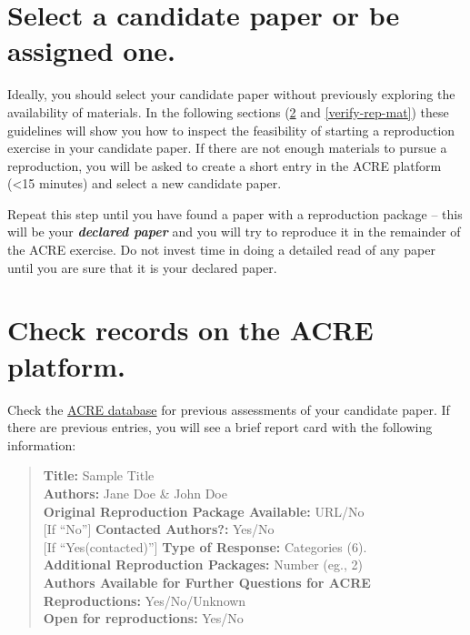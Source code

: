 \documentclass[]{book}
\begin{document}
\hypertarget{select-a-candidate-paper-or-be-assigned-one.}{%
\section{Select a candidate paper or be assigned one.}\label{select-a-candidate-paper-or-be-assigned-one.}}

Ideally, you should select your candidate paper without previously exploring the availability of materials. In the following sections (\ref{check-acre} and \ref{verify-rep-mat}) these guidelines will show you how to inspect the feasibility of starting a reproduction exercise in your candidate paper. If there are not enough materials to pursue a reproduction, you will be asked to create a short entry in the ACRE platform (\textless{}15 minutes) and select a new candidate paper.

Repeat this step until you have found a paper with a reproduction package -- this will be your \textbf{\emph{declared paper}} and you will try to reproduce it in the remainder of the ACRE exercise. Do not invest time in doing a detailed read of any paper until you are sure that it is your declared paper.

\hypertarget{check-acre}{%
\section{Check records on the ACRE platform.}\label{check-acre}}

Check the \href{ADD\%20LINK}{ACRE database} for previous assessments of your candidate paper. If there are previous entries, you will see a brief report card with the following information:

\begin{quote}
\textbf{Title:} Sample Title\\
\textbf{Authors:} Jane Doe \& John Doe\\
\textbf{Original Reproduction Package Available:} URL/No\\
{[}If ``No''{]} \textbf{Contacted Authors?:} Yes/No\\
{[}If ``Yes(contacted)''{]} \textbf{Type of Response:} Categories (6).\\
\textbf{Additional Reproduction Packages:} Number (eg., 2)\\
\textbf{Authors Available for Further Questions for ACRE Reproductions:} Yes/No/Unknown\\
\textbf{Open for reproductions:} Yes/No
\end{quote}
\end{document}
